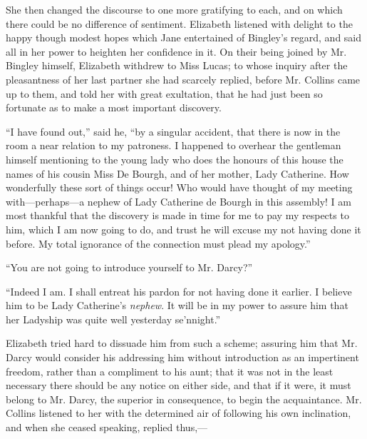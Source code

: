 \documentclass[12pt]{book}
\begin{document}
She then changed the discourse to one more gratifying to each, and on which there could be no difference of sentiment. Elizabeth listened with delight to the happy though modest hopes which Jane entertained of Bingley's regard, and said all in her power to heighten her confidence in it. On their being joined by Mr. Bingley himself, Elizabeth withdrew to Miss Lucas; to whose inquiry after the pleasantness of her last partner she had scarcely replied, before Mr. Collins came up to them, and told her with great exultation, that he had just been so fortunate as to make a most important discovery.

``I have found out,'' said he, ``by a singular accident, that there is now in the room a near relation to my patroness. I happened to overhear the gentleman himself mentioning to the young lady who does the honours of this house the names of his cousin Miss De Bourgh, and of her mother, Lady Catherine. How wonderfully these sort of things occur! Who would have thought of my meeting with---perhaps---a nephew of Lady Catherine de Bourgh in this assembly! I am most thankful that the discovery is made in time for me to pay my respects to him, which I am now going to do, and trust he will excuse my not having done it before. My total ignorance of the connection must plead my apology.''

``You are not going to introduce yourself to Mr. Darcy?''

``Indeed I am. I shall entreat his pardon for not having done it earlier. I believe him to be Lady Catherine's \textit{nephew}. It will be in my power to assure him that her Ladyship was quite well yesterday se'nnight.''

Elizabeth tried hard to dissuade him from such a scheme; assuring him that Mr. Darcy would consider his addressing him without introduction as an impertinent freedom, rather than a compliment to his aunt; that it was not in the least necessary there should be any notice on either side, and that if it were, it must belong to Mr. Darcy, the superior in consequence, to begin the acquaintance. Mr. Collins listened to her with the determined air of following his own inclination, and when she ceased speaking, replied thus,---
\end{document}
